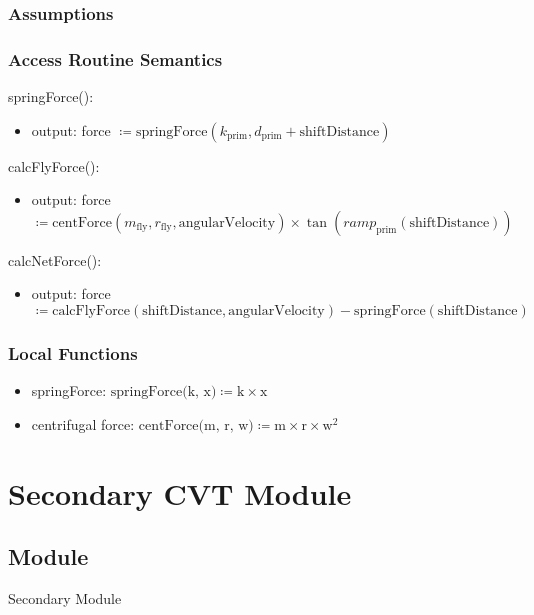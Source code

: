 \documentclass[12pt, titlepage]{article}
\begin{document}
\subsubsection{Assumptions}

\subsubsection{Access Routine Semantics}

\noindent springForce():
\begin{itemize}
  \item output: force $\coloneq \text{springForce}(k_{\text{prim}}, d_{\text{prim}} + \text{shiftDistance})$
\end{itemize}

\noindent calcFlyForce():
\begin{itemize}
\item output: force $\coloneq \text{centForce}(m_\text{fly}, r_{\text{fly}}, \text{angularVelocity}) \times \tan(ramp_{\text{prim}}(\text{shiftDistance})) $
\end{itemize}

\noindent calcNetForce():
\begin{itemize}
\item output: force $\coloneq \text{calcFlyForce}(\text{shiftDistance},\text{angularVelocity} ) - \text{springForce}(\text{shiftDistance})$
\end{itemize}
\subsubsection{Local Functions}

\begin{itemize}
  \item springForce: $\text{springForce(k, x)} \coloneq \text{k} \times \text{x}$
  \item centrifugal force: $\text{centForce(m, r, w)} \coloneq \text{m} \times \text{r} \times \text{w}^2$
\end{itemize}
\newpage


\section{Secondary CVT Module} \label{Secondary_CVT_Module} 
\subsection{Module}

Secondary Module
\end{document}
